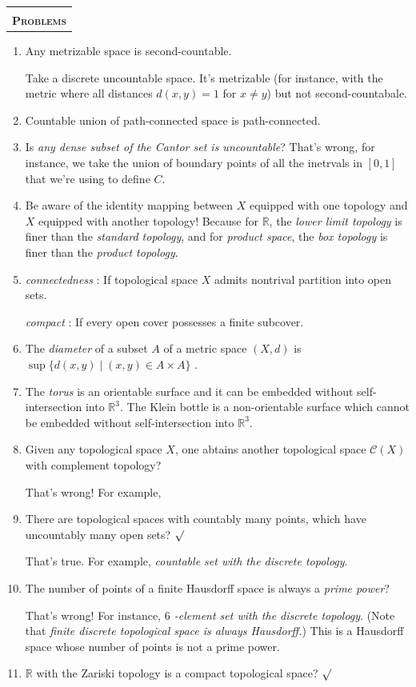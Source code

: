 \documentclass[oneside]{report}
\newcommand{\prob}[2][Problems]{\begin{center}
    \pgfornamenthan[color=#2,scale=0.25,symmetry=c]{68}\hspace{.3em}\begin{tabular}{c}  \pgfornamenthan[color=#2,scale=0.4]{60}\\[1.6em]
         \textbf{\color{#2}\fontsize{25pt}{25pt}\selectfont \textsc{#1}}  \end{tabular}\hspace{.5em}\pgfornamenthan[color=#2,scale=0.25,symmetry=h]{68}
\end{center}}
\theoremstyle{mytheoremstyle}
\theoremstyle{mytheoremstyle}
\theoremstyle{myproblemstyle}
\begin{document}
\prob{DarkGoldenrod4}
\begin{enumerate}
    \item Any metrizable space is second-countable.\cite{kelley2017general}

    Take a discrete uncountable space. It's metrizable (for instance, with the metric where all distances $d(x,y)=1$ for $x\neq y$) but not second-countabale.
    \item Countable union of path-connected space is path-connected.
    \item Is \emph{any dense subset of the Cantor set is uncountable}? That's wrong, for instance, we take the union of boundary points of all the inetrvals in $[0,1]$ that we're using to define $C$.
    \item Be aware of the identity mapping between $X$ equipped with one topology and $X$ equipped with another topology! Because for $\mathbb{R}$, the \emph{lower limit topology} is finer than the \emph{standard topology}, and for \emph{product space}, the \emph{box topology} is finer than the \emph{product topology}.
    \item \textit{connectedness} : If topological space $X$ admits nontrival partition into open sets.
    
    \textit{compact} : If every open cover possesses a finite subcover.
    \item The \emph{diameter} of a subset $A$ of a metric space $(X,d)$ is $\sup \{d(x,y)\mid (x,y)\in A\times A\}$ .
    \item  The \emph{torus} is an orientable surface and it can be embedded without self-intersection into $\mathbb{R}^3$. The Klein bottle is a non-orientable surface which cannot be embedded without self-intersection into $\mathbb{R}^3$.
    \item Given any topological space $X$, one abtains another topological space $\mathcal{C}(X)$ with complement topology? 
    
    That's wrong! For example, 
    \item There are topological spaces with countably many points, which have uncountably many open sets?  $\surd$
    
    That's true. For example, \textit{countable set with the discrete topology}.
    \item The number of points of a finite Hausdorff space is always a \textit{prime power}? 
    
    That's wrong! For instance, \emph{$6$ -element set with the discrete topology}. (Note that \emph{finite discrete topological space is always Hausdorff.}) This is a Hausdorff space whose number of points is not a prime power.
    \item $\mathbb{R}$ with the Zariski topology is a compact topological space? $\surd$
    

\end{enumerate}
\end{document}
